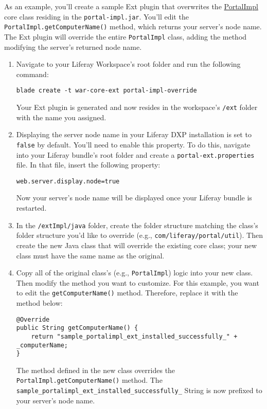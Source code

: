 As an example, you'll create a sample Ext plugin that overwrites the
\href{https://docs.liferay.com/ce/portal/7.2-latest/javadocs/portal-impl/com/liferay/portal/util/PortalImpl.html}{PortalImpl}
core class residing in the \texttt{portal-impl.jar}. You'll edit the
\texttt{PortalImpl.getComputerName()} method, which returns your
server's node name. The Ext plugin will override the entire
\texttt{PortalImpl} class, adding the method modifying the server's
returned node name.

\begin{enumerate}
\def\labelenumi{\arabic{enumi}.}
\item
  Navigate to your Liferay Workspace's root folder and run the following
  command:

\begin{verbatim}
blade create -t war-core-ext portal-impl-override
\end{verbatim}

  Your Ext plugin is generated and now resides in the workspace's
  \texttt{/ext} folder with the name you assigned.
\item
  Displaying the server node name in your Liferay DXP installation is
  set to \texttt{false} by default. You'll need to enable this property.
  To do this, navigate into your Liferay bundle's root folder and create
  a \texttt{portal-ext.properties} file. In that file, insert the
  following property:

\begin{verbatim}
web.server.display.node=true
\end{verbatim}

  Now your server's node name will be displayed once your Liferay bundle
  is restarted.
\item
  In the \texttt{/extImpl/java} folder, create the folder structure
  matching the class's folder structure you'd like to override (e.g.,
  \texttt{com/liferay/portal/util}). Then create the new Java class that
  will override the existing core class; your new class must have the
  same name as the original.
\item
  Copy all of the original class's (e.g., \texttt{PortalImpl}) logic
  into your new class. Then modify the method you want to customize. For
  this example, you want to edit the \texttt{getComputerName()} method.
  Therefore, replace it with the method below:

\begin{verbatim}
@Override
public String getComputerName() {
    return "sample_portalimpl_ext_installed_successfully_" + _computerName;
}
\end{verbatim}

  The method defined in the new class overrides the
  \texttt{PortalImpl.getComputerName()} method. The
  \texttt{sample\_portalimpl\_ext\_installed\_successfully\_} String is
  now prefixed to your server's node name.
\end{enumerate}


